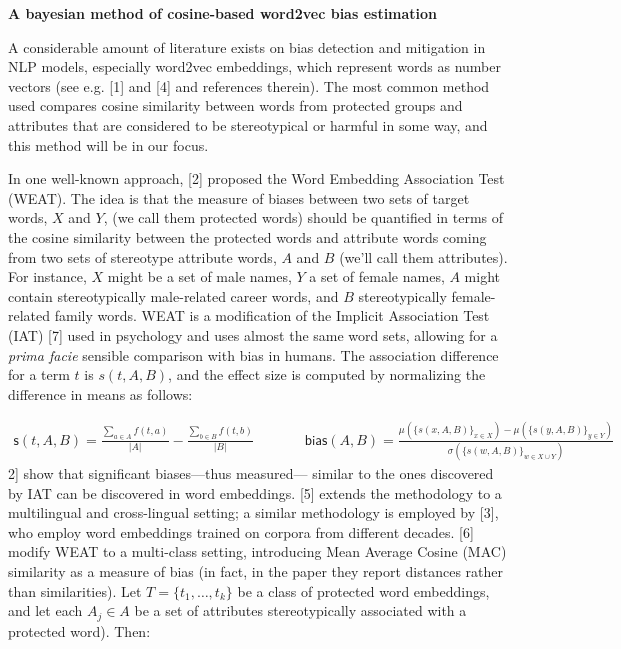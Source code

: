 \documentclass[
  12pt,
  dvipsnames,enabledeprecatedfontcommands]{scrartcl}
\author{}
\date{\vspace{-2.5em}}
\begin{document}
\begin{center}
\Large \textbf{A bayesian method of cosine-based word2vec bias estimation}
\end{center}

\vspace{1mm}


A considerable amount of literature exists on bias detection and
mitigation in NLP models, especially word2vec embeddings, which
represent words as number vectors (see e.g. {[}1{]} and {[}4{]} and
references therein). The most common method used compares cosine
similarity between words from protected groups and attributes that are
considered to be stereotypical or harmful in some way, and this method
will be in our focus.

In one well-known approach, {[}2{]} proposed the Word Embedding
Association Test (WEAT). The idea is that the measure of biases between
two sets of target words, \(X\) and \(Y\), (we call them protected
words) should be quantified in terms of the cosine similarity between
the protected words and attribute words coming from two sets of
stereotype attribute words, \(A\) and \(B\) (we'll call them
attributes). For instance, \(X\) might be a set of male names, \(Y\) a
set of female names, \(A\) might contain stereotypically male-related
career words, and \(B\) stereotypically female-related family words.
WEAT is a modification of the Implicit Association Test (IAT) {[}7{]}
used in psychology and uses almost the same word sets, allowing for a
\emph{prima facie} sensible comparison with bias in humans. The
association difference for a term \(t\) is \(s(t,A,B)\), and the effect
size is computed by normalizing the difference in means as follows:

\vspace{-3mm}

\footnotesize \begin{align}
\mathsf{s}(t,A,B)  = \frac{\sum_{a\in A}f(t,a)}{\vert A\vert} - \frac{\sum_{b\in B}f(t,b)}{\vert B\vert}
& \,\,\,\,\,\,\,\,\,\,\,\,\,\,\,\,\,
\mathsf{bias}(A,B)  = \frac{
\mu(\{s(x,A,B)\}_{x\in X}) -\mu(\{s(y,A,B)\}_{y\in Y}) 
}{
\sigma(\{s(w,A,B)\}_{w\in X\cup Y})
} \tag{WEAT}
\end{align} \normalsize \noindent {[}2{]} show that significant
biases---thus measured--- similar to the ones discovered by IAT can be
discovered in word embeddings. {[}5{]} extends the methodology to a
multilingual and cross-lingual setting; a similar methodology is
employed by {[}3{]}, who employ word embeddings trained on corpora from
different decades. {[}6{]} modify WEAT to a multi-class setting,
introducing Mean Average Cosine (MAC) similarity as a measure of bias
(in fact, in the paper they report distances rather than similarities).
Let \(T = \{t_1, \dots, t_k\}\) be a class of protected word embeddings,
and let each \(A_j\in A\) be a set of attributes stereotypically
associated with a protected word). Then:
\end{document}
